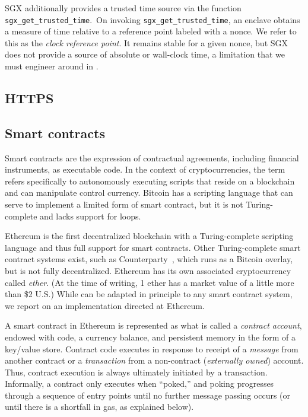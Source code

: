 SGX additionally provides a trusted time source via the function \texttt{sgx\_get\_trusted\_time}.~On invoking \texttt{sgx\_get\_trusted\_time}, an enclave obtains a measure of time relative to a reference point labeled with a nonce. We refer to this as the \emph{clock reference point}. It remains stable for a given nonce, but SGX does not provide a source of absolute or wall-clock time, a limitation that we must engineer around in \tc.

\subsection{HTTPS}
\subsection{Smart contracts}

Smart contracts are the expression of contractual agreements, including financial instruments, as executable code. In the context of cryptocurrencies, the term refers specifically to autonomously executing scripts that reside on a blockchain and can manipulate control currency. Bitcoin has a scripting language that can serve to implement a limited form of smart contract, but it is not Turing-complete and lacks support for loops. 

Ethereum is the first decentralized blockchain with a Turing-complete scripting language and thus full support for smart contracts. Other Turing-complete smart contract systems exist, such as Counterparty~\cite{}, which runs as a Bitcoin overlay, but is not fully decentralized. Ethereum has its own associated cryptocurrency called \emph{ether}. (At the time of writing, 1 ether has a market value of a little more than \$2 U.S.) While \tc can be adapted in principle to any smart contract system, we report on an implementation directed at Ethereum.

A smart contract in Ethereum is represented as what is called a \emph{contract account}, endowed with code, a currency balance, and persistent memory in the form of a key/value store. Contract code executes in response to receipt of a \emph{message} from another contract or a \emph{transaction} from a non-contract (\emph{externally owned}) account. Thus, contract execution is always ultimately initiated by a transaction. Informally, a contract only executes when ``poked,'' and poking progresses through a sequence of entry points until no further message passing occurs (or until there is a shortfall in gas, as explained below).

